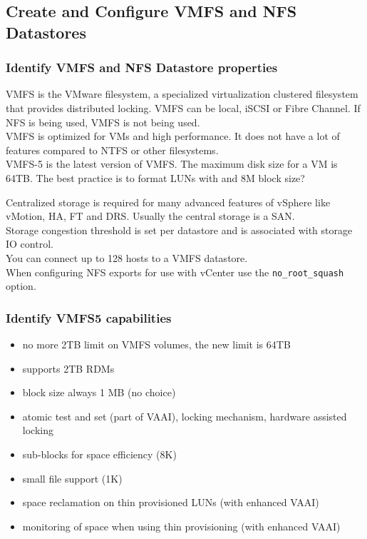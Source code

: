 \subsection{Create and Configure VMFS and NFS Datastores}

\subsubsection{Identify VMFS and NFS Datastore properties}

VMFS is the VMware filesystem, a specialized virtualization clustered
filesystem that provides distributed locking. VMFS can be local, iSCSI or
Fibre Channel. If NFS is being used, VMFS is not being used.\\

VMFS is optimized for VMs and high performance. It does not have a lot of
features compared to NTFS or other filesystems.\\

VMFS-5 is the latest version of VMFS. The maximum disk size for a VM is
64TB. The best practice is to format LUNs with and 8M block size?

Centralized storage is required for many advanced features of vSphere like
vMotion, HA, FT and DRS. Usually the central storage is a SAN.\\

Storage congestion threshold is set per datastore and is associated with
storage IO control.\\

You can connect up to 128 hosts to a VMFS datastore.\\

When configuring NFS exports for use with vCenter use the
\texttt{no\_root\_squash} option.

\subsubsection{Identify VMFS5 capabilities}

\begin{itemize}

\item no more 2TB limit on VMFS volumes, the new limit is 64TB
\item supports 2TB RDMs
\item block size always 1 MB (no choice)
\item atomic test and set (part of VAAI), locking mechanism, hardware assisted
locking
\item sub-blocks for space efficiency (8K)
\item small file support (1K)
\item space reclamation on thin provisioned LUNs (with enhanced VAAI)
\item monitoring of space when using thin provisioning (with enhanced VAAI)

\end{itemize}

